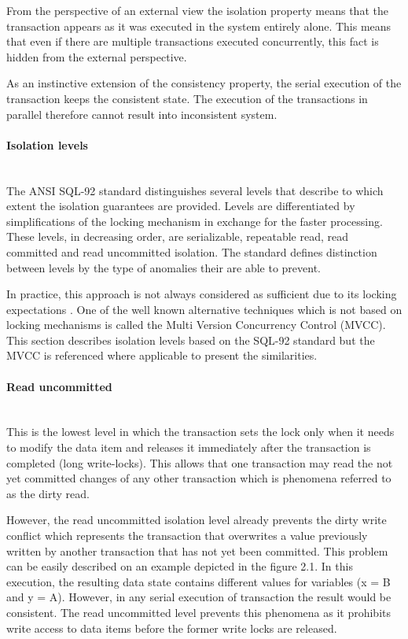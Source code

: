\documentclass[oneside,
  digital, %
  table,   %
  lof,     %
  lot,     %
]{fithesis3}
\newcommand{\newlinepar}[1]{\paragraph{#1}\needspace{4\baselineskip}\mbox{}\\}
\begin{document}
From the perspective of an external view the isolation property means that the transaction appears as it was executed in the system entirely alone. This means that even if there are multiple transactions executed concurrently, this fact is hidden from the external perspective.

As an instinctive extension of the consistency property, the serial execution of the transaction keeps the consistent state. The execution of the transactions in parallel therefore cannot result into inconsistent system.

\newlinepar{Isolation levels}

The ANSI SQL-92 \cite{sql-92} standard distinguishes several levels that describe to which extent the isolation guarantees are provided. Levels are differentiated by simplifications of the locking mechanism in exchange for the faster processing. These levels, in decreasing order, are serializable, repeatable read, read committed and read uncommitted isolation. The standard defines distinction between levels by the type of anomalies their are able to prevent. 

In practice, this approach is not always considered as sufficient due to its locking expectations \cite{ansi-sql-critique}. One of the well known alternative techniques which is not based on locking mechanisms is called the Multi Version Concurrency Control (MVCC). This section describes isolation levels based on the SQL-92 standard but the MVCC is referenced where applicable to present the similarities.

\newlinepar{Read uncommitted}

This is the lowest level in which the transaction sets the lock only when it needs to modify the data item and releases it immediately after the transaction is completed (long write-locks). This allows that one transaction may read the not yet committed changes of any other transaction which is phenomena referred to as the dirty read.

However, the read uncommitted isolation level already prevents the dirty write conflict which represents the transaction that overwrites a value previously written by another transaction that has not yet been committed. This problem can be easily described on an example depicted in the figure 2.1. In this execution, the resulting data state contains different values for variables (x = B and y = A). However, in any serial execution of transaction the result would be consistent. The read uncommitted level prevents this phenomena as it prohibits write access to data items before the former write locks are released.
\end{document}
